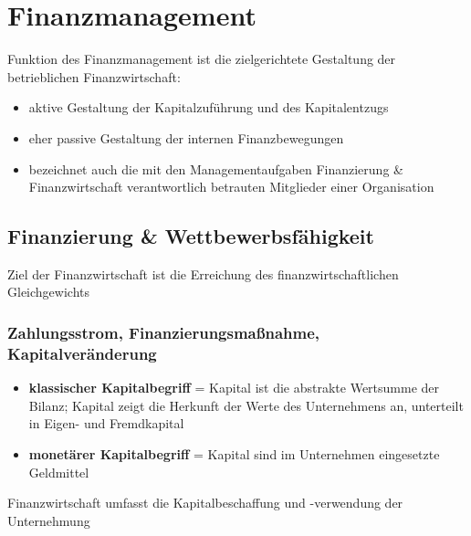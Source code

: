 \documentclass[11pt]{article}
\date{\today}
\title{}
\begin{document}
\tableofcontents

\section{Finanzmanagement}
\label{sec:orgbeea28e}
Funktion des Finanzmanagement ist die zielgerichtete Gestaltung der betrieblichen Finanzwirtschaft:
\begin{itemize}
\item aktive Gestaltung der Kapitalzuführung und des Kapitalentzugs
\item eher passive Gestaltung der internen Finanzbewegungen
\item bezeichnet auch die mit den Managementaufgaben Finanzierung \& Finanzwirtschaft verantwortlich betrauten Mitglieder einer Organisation
\end{itemize}
\subsection{Finanzierung \& Wettbewerbsfähigkeit}
\label{sec:orgc0c8d92}
Ziel der Finanzwirtschaft ist die Erreichung des finanzwirtschaftlichen Gleichgewichts
\subsubsection{Zahlungsstrom, Finanzierungsmaßnahme, Kapitalveränderung}
\label{sec:orga3dc6b1}
\begin{itemize}
\item \textbf{klassischer Kapitalbegriff} = Kapital ist die abstrakte Wertsumme der Bilanz; Kapital zeigt die Herkunft der Werte des Unternehmens an, unterteilt in Eigen- und Fremdkapital
\item \textbf{monetärer Kapitalbegriff} = Kapital sind im Unternehmen eingesetzte Geldmittel
\end{itemize}

Finanzwirtschaft umfasst die Kapitalbeschaffung und -verwendung der Unternehmung
\end{document}

